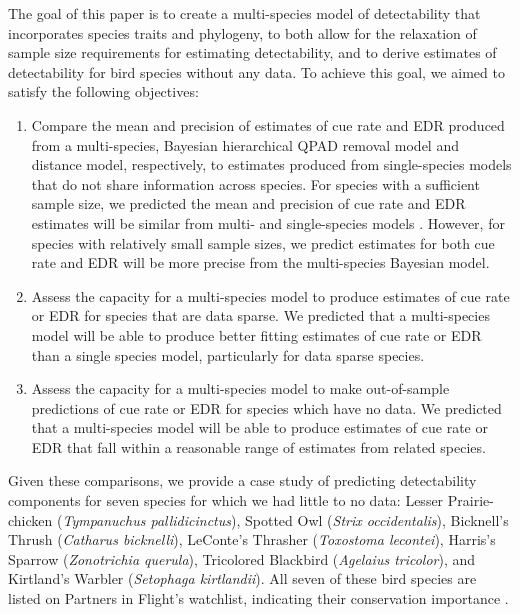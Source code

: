 \documentclass[12pt]{article}
\begin{document}
\par The goal of this paper is to create a multi-species model of detectability that incorporates species traits and phylogeny, to both allow for the relaxation of sample size requirements for estimating detectability, and to derive estimates of detectability for bird species without any data.
To achieve this goal, we aimed to satisfy the following objectives:
\begin{enumerate}
	\item Compare the mean and precision of estimates of cue rate and EDR produced from a multi-species, Bayesian hierarchical QPAD removal model and distance model, respectively, to estimates produced from single-species models that do not share information across species.
	For species with a sufficient sample size, we predicted the mean and precision of cue rate and EDR estimates will be similar from multi- and single-species models \citep{edwards_point_2023}.
	However, for species with relatively small sample sizes, we predict estimates for both cue rate and EDR will be more precise from the multi-species Bayesian model.
	\item Assess the capacity for a multi-species model to produce estimates of cue rate or EDR for species that are data sparse.
	We predicted that a multi-species model will be able to produce better fitting estimates of cue rate or EDR than a single species model, particularly for data sparse species.
	\item Assess the capacity for a multi-species model to make out-of-sample predictions of cue rate or EDR for species which have no data.
	We predicted that a multi-species model will be able to produce estimates of cue rate or EDR that fall within a reasonable range of estimates from related species.
\end{enumerate}

Given these comparisons, we provide a case study of predicting detectability components for seven species for which we had little to no data: Lesser Prairie-chicken (\textit{Tympanuchus pallidicinctus}), Spotted Owl (\textit{Strix occidentalis}), Bicknell’s Thrush (\textit{Catharus bicknelli}), LeConte’s Thrasher (\textit{Toxostoma lecontei}), Harris’s Sparrow (\textit{Zonotrichia querula}), Tricolored Blackbird (\textit{Agelaius tricolor}), and Kirtland’s Warbler (\textit{Setophaga kirtlandii}). 	
All seven of these bird species are listed on Partners in Flight’s watchlist, indicating their conservation importance \citep{will_handbook_2020}. 	
\end{document}
